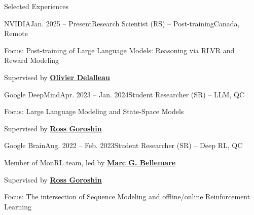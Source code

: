 
\begin{xSection}{Selected Experiences}

    \vspace{4mm}


    \begin{tSubsection}{NVIDIA}{Jan. 2025 -- Present}{Research Scientist {\scriptsize (RS)} -- Post-training}{Canada, Remote}
    \item Focus: Post-training of Large Language Models: Reasoning via RLVR and Reward Modeling
        \item Supervised by \textbf{\href{https://scholar.google.ca/citations?user=zqLpO2QAAAAJ&hl=en}{Olivier Delalleau}}
    \end{tSubsection}


    \begin{tSubsection}{Google DeepMind}{Apr. 2023 -- Jan. 2024}{Student Researcher {\scriptsize (SR)} -- LLM}{\mtl, QC}
        \item Focus: Large Language Modeling and State-Space Models
        \item Supervised by \textbf{\href{https://goroshin.github.io/}{Ross Goroshin}}
    \end{tSubsection}
    

    \begin{tSubsection}{Google Brain}{Aug. 2022 -- Feb. 2023}{Student Researcher {\scriptsize (SR)} -- Deep RL}{\mtl, QC}
        \item Member of MonRL team, led by \textbf{\href{http://www.marcgbellemare.info/}{Marc G. Bellemare}}
        \item Supervised by \textbf{\href{https://goroshin.github.io/}{Ross Goroshin}}
        \item Focus: The intersection of Sequence Modeling and offline/online Reinforcement Learning
    \end{tSubsection}



\end{xSection}
